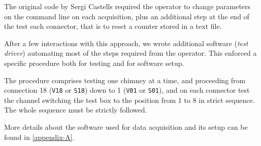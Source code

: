 The original code by Sergi Castells required the operator to change
parameters on the command line on each acquisition, plus an additional step at the end of the test each connector, that is to reset a counter stored in a text file.

After a few interactions with this approach, we wrote additional
software (\emph{test driver}) automating most of the steps required from the operator. This enforced a specific procedure both for testing and for software setup.

The procedure comprises testing one chimney at a time, and proceeding from connection 18 (\texttt{V18} or \texttt{S18}) down to 1 (\texttt{V01} or \texttt{S01}), and on each connector test the channel switching the test box to the position from 1 to 8 in strict sequence. The whole sequence must be strictly followed.

More details about the software used for data acquisition and its setup can be found in \ref{appendix-A}.

